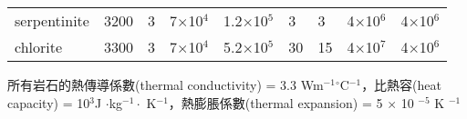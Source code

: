 \begin{landscape}
\begin{table}[htp]
\begin{tabular}{m{5.5cm}m{2cm}m{2cm}m{2.4cm}m{2.3cm}m{1cm}m{1cm}m{1.7cm}m{1.7cm}}
        serpentinite                                                                                & 3200                                                            & 3    & 7$\times$10$^4$                                                              & 1.2$\times$10$^5$                                                                          & 3                                                               & 3                                                               & 4$\times$10$^6$                                                & 4$\times$10$^6$                                                 \\
        chlorite                                                                                    & 3300                                                            & 3    & 7$\times$10$^4$                                                              & 5.2$\times$10$^5$                                                                          & 30                                                              & 15                                                              & 4$\times$10$^7$                                                & 4$\times$10$^6$                                                 \\ \hline
    \end{tabular}
\label{table::phase_table}
\footnotesize 所有岩石的熱傳導係數(thermal conductivity) = 3.3 Wm$^{-1}$$^{\circ}$C$^{-1}$，比熱容(heat capacity) = 10$^3$J $\cdot$kg$^{-1} \cdot$ K$^{-1}$，熱膨脹係數(thermal expansion) = 5 $\times$ 10 $^{-5}$ K $^{-1}$
\end{table}
\end{landscape}